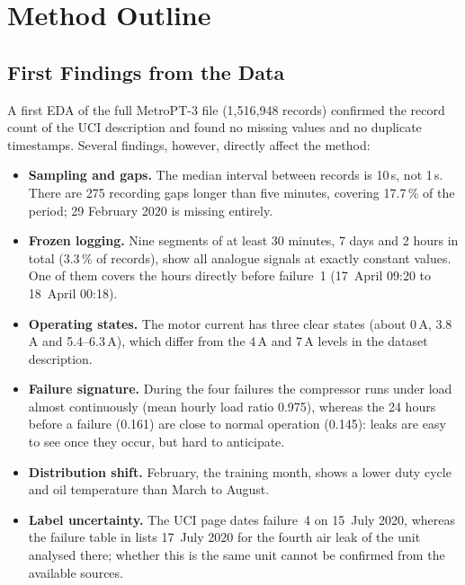 \section{Method Outline}
\label{sec:outline}

\subsection{First Findings from the Data}
A first EDA of the full MetroPT-3 file (1{,}516{,}948 records) confirmed the record count of the UCI description and found no missing values and no duplicate timestamps. Several findings, however, directly affect the method:
\begin{itemize}[itemsep=2pt]
  \item \textbf{Sampling and gaps.} The median interval between records is 10\,s, not 1\,s. There are 275 recording gaps longer than five minutes, covering 17.7\,\% of the period; 29 February 2020 is missing entirely.
  \item \textbf{Frozen logging.} Nine segments of at least 30 minutes, 7 days and 2 hours in total (3.3\,\% of records), show all analogue signals at exactly constant values. One of them covers the hours directly before failure~1 (17~April 09:20 to 18~April 00:18).
  \item \textbf{Operating states.} The motor current has three clear states (about 0\,A, 3.8\,A and 5.4--6.3\,A), which differ from the 4\,A and 7\,A levels in the dataset description.
  \item \textbf{Failure signature.} During the four failures the compressor runs under load almost continuously (mean hourly load ratio 0.975), whereas the 24 hours before a failure (0.161) are close to normal operation (0.145): leaks are easy to see once they occur, but hard to anticipate.
  \item \textbf{Distribution shift.} February, the training month, shows a lower duty cycle and oil temperature than March to August.
  \item \textbf{Label uncertainty.} The UCI page dates failure~4 on 15~July 2020, whereas the failure table in \citet{barros2020thesis} lists 17~July 2020 for the fourth air leak of the unit analysed there; whether this is the same unit cannot be confirmed from the available sources.
\end{itemize}


